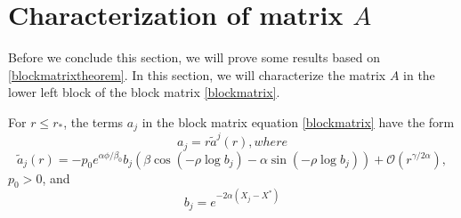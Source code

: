 \documentclass[thesis.tex]{subfiles}
\begin{document}
\section{Characterization of matrix $A$}

Before we conclude this section, we will prove some results based on \cref{blockmatrixtheorem}. In this section, we will characterize the matrix $A$ in the lower left block of the block matrix \cref{blockmatrix}. 

\begin{lemma}\label{lemma:ajparam}
For $r \leq r_*$, the terms $a_j$ in the block matrix equation \cref{blockmatrix} have the form
\[
a_j = r \tilde{a}^j(r), where
\]
\begin{equation}\label{ajparam}
\tilde{a}_j(r) = -p_0 e^{\alpha \phi/\beta_0} b_j \left( \beta \cos\left(-\rho \log b_j \right) - \alpha \sin \left(-\rho \log b_j \right) \right) + \mathcal{O}(r^{\gamma/2\alpha}),
\end{equation}
$p_0 > 0$, and
\begin{equation}\label{bj2}
b_j = e^{-2 \alpha (X_j - X^*)}
\end{equation}


\end{lemma}
\end{document}
